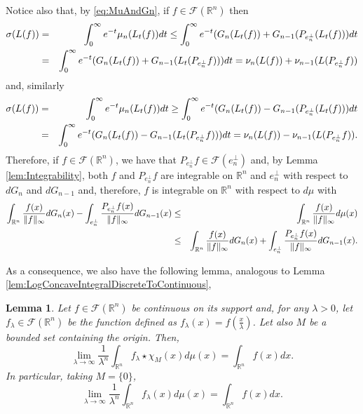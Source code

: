 \documentclass{amsart}
\newcommand{\R}{\mathbb R}
\newtheorem{lemma}{Lemma}[section]
\theoremstyle{remark}
\theoremstyle{definition}
\numberwithin{equation}{section}
\begin{document}
Notice also that, by \eqref{eq:MuAndGn}, if $f\in\mathcal{F}(\R^n)$ then
\begin{eqnarray*}
\sigma(L(f))&=&\int_0^\infty e^{-t} \mu_n(L_t(f))dt\leq \int_0^\infty e^{-t}(G_n(L_t(f))+G_{n-1}(P_{e_n^\perp}(L_t(f)))dt\cr
&=&\int_0^\infty e^{-t}(G_n(L_t(f))+G_{n-1}(L_t(P_{e_n^\perp}f)))dt=\nu_n(L(f))+\nu_{n-1}(L(P_{e_n^\perp}f))
\end{eqnarray*}
and, similarly
\begin{eqnarray*}
\sigma(L(f))&=&\int_0^\infty e^{-t} \mu_n(L_t(f))dt\geq \int_0^\infty e^{-t}(G_n(L_t(f))-G_{n-1}(P_{e_n^\perp}(L_t(f)))dt\cr
&=&\int_0^\infty e^{-t}(G_n(L_t(f))-G_{n-1}(L_t(P_{e_n^\perp}f)))dt=\nu_n(L(f))-\nu_{n-1}(L(P_{e_n^\perp}f)).
\end{eqnarray*}
Therefore, if $f\in\mathcal{F}(\R^n)$, we have that $P_{e_n^\perp}f\in\mathcal{F}(e_n^\perp)$ and, by Lemma \ref{lem:Integrability}, both $f$ and $P_{e_n^\perp}f$ are integrable on $\R^n$ and $e_n^\perp$ with respect to $dG_n$ and $dG_{n-1}$ and, therefore, $f$ is integrable on $\R^n$ with respect to $d\mu$ with
\begin{eqnarray}\label{eq:integralMuandm}
\int_{\R^n}\frac{f(x)}{\Vert f\Vert_\infty}dG_n(x)-\int_{e_n^\perp}\frac{P_{e_n^\perp}f(x)}{\Vert f\Vert_\infty}dG_{n-1}(x)&\leq&\int_{\R^n}\frac{f(x)}{\Vert f\Vert_\infty}d\mu(x)\cr
&\leq&\int_{\R^n}\frac{f(x)}{\Vert f\Vert_\infty}dG_n(x)+\int_{e_n^\perp}\frac{P_{e_n^\perp}f(x)}{\Vert f\Vert_\infty}dG_{n-1}(x).
\end{eqnarray}

As a consequence, we also have the following lemma, analogous to Lemma \ref{lem:LogConcaveIntegralDiscreteToContinuous},
\begin{lemma}\label{lem:LogConcaveIntegralMuToContinuous}
Let $f\in\mathcal{F}(\R^n)$ be continuous on its support and, for any $\lambda>0$, let $f_\lambda\in\mathcal{F}(\R^n)$ be the function defined as $f_\lambda(x)= f\left(\frac{x}{\lambda}\right)$. Let also $M$ be a bounded set containing the origin. Then,
$$
\lim_{\lambda\to\infty}\frac{1}{\lambda^n}\int_{\R^n}f_\lambda\star\chi_{M}(x)d\mu(x)=\int_{\R^n}f(x)dx.
$$
In particular, taking $M=\{0\}$,
$$
\lim_{\lambda\to\infty}\frac{1}{\lambda^n}\int_{\R^n}f_\lambda(x)d\mu(x)=\int_{\R^n}f(x)dx.
$$
\end{lemma}
\end{document}
